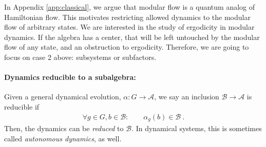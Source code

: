 \documentclass[a4paper,11pt]{article}
\theoremstyle{definition}
\newcommand{\mA}{\mathcal{A}}
\newcommand{\mB}{\mathcal{B}}
\begin{document}
In Appendix \ref{app:classical}, we argue that modular flow is a quantum analog of Hamiltonian flow. This motivates restricting allowed dynamics to the modular flow of arbitrary states. We are interested in the study of ergodicity in modular dynamics. If the algebra has a center, that will be left untouched by the modular flow of any state, and an obstruction to ergodicity. Therefore, we are going to focus on case 2 above: subsystems or subfactors.







\paragraph{Dynamics reducible to a subalgebra:} Given a general dynamical evolution, $\alpha:G\to \mA$, we say an inclusion $\mB\to \mA$ is reducible if 
\begin{align}
    \forall g\in G,b\in\mB:\qquad \alpha_g(b)\in \mB\ . 
\end{align}
Then, the dynamics can be {\it reduced} to $\mB$. In dynamical systems, this is sometimes called {\it autonomous dynamics}, as well.
\end{document}
